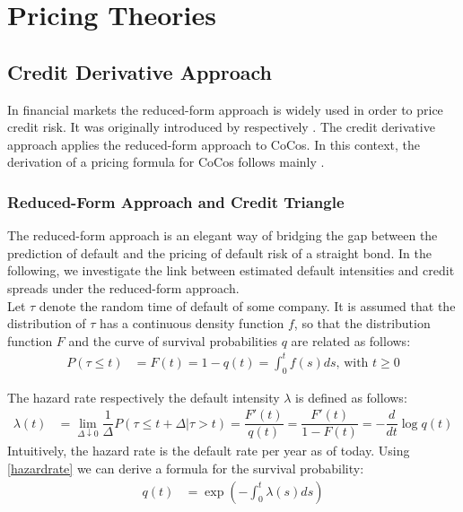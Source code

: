 \chapter{Pricing Theories}

\section{Credit Derivative Approach} \label{sec:creditderivativeapproach}

In financial markets the reduced-form approach is widely used in order to price credit risk. It was originally introduced by \citet{jarrow1995pricing} respectively \citet{duffie1999modeling}. The credit derivative approach applies the reduced-form approach to CoCos. In this context, the derivation of a pricing formula for CoCos follows mainly \citet{de2011pricing}. 

\subsection{Reduced-Form Approach and Credit Triangle}

The reduced-form approach is an elegant way of bridging the gap between the prediction of default and the pricing of default risk of a straight bond. In the following, we investigate the link between estimated default intensities and credit spreads under the reduced-form approach. \citep{lando2009credit}\\

Let $\tau$ denote the random time of default of some company. It is assumed that the distribution of $\tau$ has a continuous density function $f$, so that the distribution function $F$ and the curve of survival probabilities $q$ are related as follows:  
\begin{align}
P(\tau \leq t) &= F(t) = 1 - q(t) = \int_0^t f(s) ds \text{, with } t \geq 0
\end{align}

The hazard rate respectively the default intensity $\lambda$ is defined as follows:
\begin{align} \label{hazardrate}
\lambda(t) &= \lim_{\Delta \downarrow 0} \dfrac{1}{\Delta} P(\tau \leq t + \Delta | \tau > t) = \dfrac{F'(t)}{q(t)} = \dfrac{F'(t)}{1 - F(t)} = - \dfrac{d}{dt} \log q(t)
\end{align}
Intuitively, the hazard rate is the default rate per year as of today. Using \ref{hazardrate} we can derive a formula for the survival probability:
\begin{align}
q(t) &= \exp \left(- \int_0^t \lambda (s) ds \right)
\end{align}


